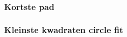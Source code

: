 
\subsubsection{Kortste pad}
\label{subsec: Kortste pad}


\subsubsection{Kleinste kwadraten circle fit}
\label{subsec: Kleinste kwadraten circle fit}
